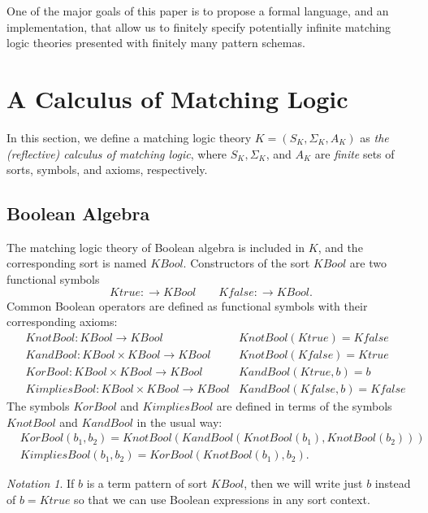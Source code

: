 \documentclass[UTF8]{article}
\newcounter{thmcounter}
\theoremstyle{plain}
\theoremstyle{definition}
\theoremstyle{remark}
\newtheorem{notation}[thmcounter]{Notation}
\newcommand{\KBool}{\mathit{KBool}}
\newcommand{\Ktrue}{\mathit{Ktrue}}
\newcommand{\Kfalse}{\mathit{Kfalse}}
\newcommand{\KandBool}{\mathit{KandBool}}
\newcommand{\KorBool}{\mathit{KorBool}}
\newcommand{\KnotBool}{\mathit{KnotBool}}
\newcommand{\KimpliesBool}{\mathit{KimpliesBool}}
\begin{document}
One of the major goals of this paper is to propose a formal language,
and an implementation, that allow us to finitely specify potentially
infinite matching logic theories presented with finitely many pattern schemas.


\section{A Calculus of Matching Logic}

In this section, we define a matching logic theory $K = (S_K, \Sigma_K, A_K)$ 
as \emph{the (reflective) calculus of matching logic},
where $S_K, \Sigma_K$, and $A_K$ are \emph{finite} sets of sorts,
symbols, and axioms,  respectively.

\subsection{Boolean Algebra}

The matching logic theory of Boolean algebra is included in $K$,
and the corresponding sort is named $\KBool$.
Constructors of the sort $\KBool$ are two functional symbols
\begin{equation*}
\Ktrue \colon \to \KBool \qquad \Kfalse \colon \to \KBool.
\end{equation*}
Common Boolean operators are defined as functional symbols with their
corresponding axioms:
\begin{align*}
&\KnotBool \colon \KBool \to \KBool
&\KnotBool(\Ktrue) = \Kfalse
\\
&\KandBool \colon \KBool \times \KBool \to \KBool
&\KnotBool(\Kfalse) = \Ktrue
\\
&\KorBool \colon \KBool \times \KBool \to \KBool
&\KandBool(\Ktrue, b) = b
\\
&\KimpliesBool \colon \KBool \times \KBool \to \KBool
&\KandBool(\Kfalse, b) = \Kfalse
\end{align*}
The symbols $\KorBool$ and $\KimpliesBool$ are defined in terms of the symbols
$\KnotBool$ and $\KandBool$ in the usual way:
\begin{align*}
&\KorBool(b_1, b_2) = \KnotBool(\KandBool(\KnotBool(b_1), \KnotBool(b_2)))
\\
&\KimpliesBool(b_1, b_2) = \KorBool(\KnotBool(b_1), b_2).
\end{align*}

\begin{notation}
	If $b$ is a term pattern of sort $\KBool$, then we will write just $b$ instead of $b = \Ktrue$ so that we can use Boolean expressions in any sort context.
\end{notation}
\end{document}
